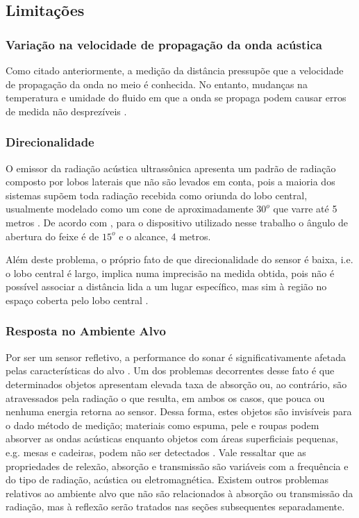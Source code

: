 \subsection{Limitações}

\subsubsection{Variação na velocidade de propagação da onda acústica}
Como citado anteriormente, a medição da distância pressupõe que a velocidade de propagação da onda no meio é conhecida. 
No entanto, mudanças na temperatura e umidade do fluido em que a onda se propaga podem causar erros de medida não desprezíveis \cite{everett}.

\subsubsection{Direcionalidade}
O emissor da radiação acústica ultrassônica apresenta um padrão de radiação\cite{balanis,pozar} composto por lobos laterais\cite{balanis,pozar} que 
não são levados em conta, pois a maioria dos sistemas supõem toda radiação recebida como oriunda do lobo central\cite{balanis,pozar}, usualmente 
modelado como um cone de aproximadamente $30^o$ que varre até 5 metros \cite{murphy}. De acordo com \cite{HC-SR04}, para o dispositivo utilizado 
nesse trabalho o ângulo de abertura do feixe é de $15^o$ e o alcance, 4 metros.

Além deste problema, o próprio fato de que direcionalidade do sensor é baixa, i.e. o lobo central é largo, implica numa 
imprecisão na medida obtida, pois não é possível associar a distância lida a um lugar específico, mas sim à região no espaço coberta pelo lobo 
central \cite{siegwart}.

\subsubsection{Resposta no Ambiente Alvo}
Por ser um sensor refletivo, a performance do sonar é significativamente afetada pelas características do alvo \cite{everett}.
Um dos problemas decorrentes desse fato é que determinados objetos apresentam elevada taxa de absorção ou, ao contrário, são atravessados pela 
radiação o que resulta, em ambos os casos, que pouca ou nenhuma energia retorna ao sensor. Dessa forma, estes objetos são invisíveis para o dado 
método de medição; materiais como espuma, pele e roupas podem absorver as ondas acústicas \cite{siegwart} enquanto objetos com áreas superficiais 
pequenas, e.g. mesas e cadeiras, podem não ser detectados \cite{murphy}. Vale ressaltar que as propriedades de relexão, absorção e transmissão 
são variáveis com a frequência e do tipo de radiação, acústica ou eletromagnética.
Existem outros problemas relativos ao ambiente alvo que não são relacionados à absorção ou transmissão da radiação, mas à reflexão serão tratados nas 
seções subsequentes separadamente.


